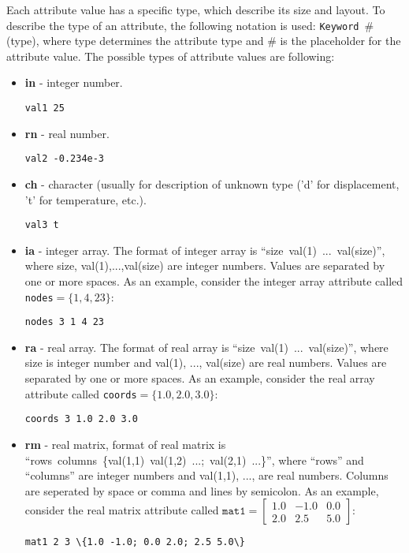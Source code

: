 \documentclass[a4paper]{article}
\newcommand{\param}[1]{\texttt{#1}} %
\newcommand{\field}[2]{\param{#1}~\#{\tiny(#2)}} %
\begin{document}
Each attribute value has a specific type, which describe its size and layout. To describe the type of an attribute, the following notation is used: 
\field{Keyword}{type}, where type determines the attribute type and \# is the placeholder for the attribute value.
The possible types of attribute values are following:
\begin{itemize}
\item \textbf{in} - integer number.
\begin{lstlisting}[style=oofem, language=oofeminput, moreemph={val1}]
val1 25
\end{lstlisting}

\item \textbf{rn} - real number.
\begin{lstlisting}[style=oofem, language=oofeminput, moreemph={val2}]
val2 -0.234e-3
\end{lstlisting}
\item \textbf{ch} - character (usually for description of unknown type ('d' for
displacement, 't' for temperature, etc.).
\begin{lstlisting}[style=oofem, language=oofeminput, moreemph={val3}]
val3 t
\end{lstlisting}

\item \textbf{ia} - integer array. The format of integer array is
``size~val(1)~...~val(size)'', where size, val(1),...,val(size) are
integer numbers. Values are separated by one or more spaces. As an example, consider the integer array attribute called \param{nodes}$=\{1,4,23\}$:
\begin{lstlisting}[style=oofem, language=oofeminput, moreemph={nodes}]
nodes 3 1 4 23
\end{lstlisting}
\item \textbf{ra} - real array. The format of real array is
``size~val(1)~...~val(size)'', where size is integer number and val(1),
..., val(size) are real numbers. Values are separated by one or more spaces. As an example, consider the real array attribute called \param{coords}$=\{1.0,2.0,3.0\}$:
\begin{lstlisting}[style=oofem, language=oofeminput, moreemph={coords}]
coords 3 1.0 2.0 3.0
\end{lstlisting}
\item \textbf{rm} - real matrix, format of real matrix is\\
``rows~columns~\{val(1,1)~val(1,2)~...;~val(2,1)~...\}'', where ``rows'' and ``columns'' are integer numbers and val(1,1),
..., are real numbers. Columns are seperated by space or comma and lines by semicolon.
As an example, consider the real matrix attribute called $\param{mat1}=\left[\begin{array}{ccc}1.0&-1.0&0.0\\2.0&2.5&5.0\end{array}\right]$:
\begin{lstlisting}[style=oofem, language=oofeminput, moreemph={mat1}]
mat1 2 3 \{1.0 -1.0; 0.0 2.0; 2.5 5.0\}
\end{lstlisting}


\end{itemize}
\end{document}

